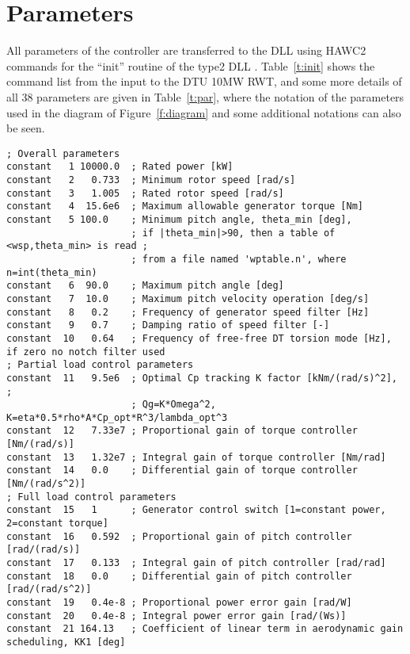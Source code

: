 \section{Parameters}\label{s:par}

All parameters of the controller are transferred to the DLL using HAWC2 commands for the ``init'' routine of the type2 DLL \cite{Larsen12}. Table~\ref{t:init} shows the command list from the input to the DTU 10MW RWT, and some more details of all 38 parameters are given in Table~\ref{t:par}, where the notation of the parameters used in the diagram of Figure~\ref{f:diagram} and some additional notations can also be seen.

\begin{table}[t!]
\begin{center}
\scriptsize
\begin{verbatim}
; Overall parameters
constant   1 10000.0  ; Rated power [kW]
constant   2   0.733  ; Minimum rotor speed [rad/s]
constant   3   1.005  ; Rated rotor speed [rad/s]
constant   4  15.6e6  ; Maximum allowable generator torque [Nm]
constant   5 100.0    ; Minimum pitch angle, theta_min [deg],
                      ; if |theta_min|>90, then a table of <wsp,theta_min> is read ;
                      ; from a file named 'wptable.n', where n=int(theta_min)
constant   6  90.0    ; Maximum pitch angle [deg]
constant   7  10.0    ; Maximum pitch velocity operation [deg/s]
constant   8   0.2    ; Frequency of generator speed filter [Hz]
constant   9   0.7    ; Damping ratio of speed filter [-]
constant  10   0.64   ; Frequency of free-free DT torsion mode [Hz], if zero no notch filter used
; Partial load control parameters
constant  11   9.5e6  ; Optimal Cp tracking K factor [kNm/(rad/s)^2], ;
                      ; Qg=K*Omega^2, K=eta*0.5*rho*A*Cp_opt*R^3/lambda_opt^3
constant  12   7.33e7 ; Proportional gain of torque controller [Nm/(rad/s)]
constant  13   1.32e7 ; Integral gain of torque controller [Nm/rad]
constant  14   0.0    ; Differential gain of torque controller [Nm/(rad/s^2)]
; Full load control parameters
constant  15   1      ; Generator control switch [1=constant power, 2=constant torque]
constant  16   0.592  ; Proportional gain of pitch controller [rad/(rad/s)]
constant  17   0.133  ; Integral gain of pitch controller [rad/rad]
constant  18   0.0    ; Differential gain of pitch controller [rad/(rad/s^2)]
constant  19   0.4e-8 ; Proportional power error gain [rad/W]
constant  20   0.4e-8 ; Integral power error gain [rad/(Ws)]
constant  21 164.13   ; Coefficient of linear term in aerodynamic gain scheduling, KK1 [deg]

\end{verbatim}
\end{center}
\end{table}
